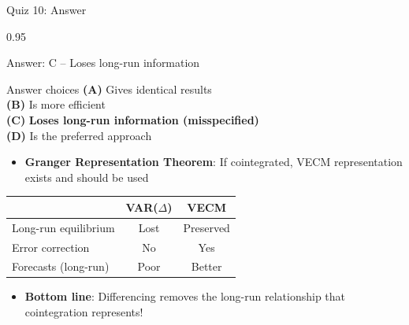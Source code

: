 \documentclass[9pt, aspectratio=169, t]{beamer}
\begin{document}
\begin{frame}{Quiz 10: Answer}
    \begin{cminipage}{0.95\textwidth}
    {\footnotesize
    \begin{exampleblock}{Answer: C -- Loses long-run information}

    \begin{block}{Answer choices}
        \textcolor{MainBlue}{\textbf{(A)}} Gives identical results \incorrect\\[2pt]
        \textcolor{MainBlue}{\textbf{(B)}} Is more efficient \incorrect\\[2pt]
        \textcolor{MainBlue}{\textbf{(C)}} \textbf{\textcolor{Forest}{Loses long-run information (misspecified)}} \correct\\[2pt]
        \textcolor{MainBlue}{\textbf{(D)}} Is the preferred approach \incorrect
    \end{block}

        \vspace{0.1cm}

        \begin{itemize}
            \item \textbf{Granger Representation Theorem}: If cointegrated, VECM representation exists and should be used
        \end{itemize}

        \vspace{0.1cm}
        \begin{center}
        \begin{tabular}{lcc}
            \toprule
            & \textbf{VAR($\Delta$)} & \textbf{VECM} \\
            \midrule
            Long-run equilibrium & Lost & Preserved \\
            Error correction & No & Yes \\
            Forecasts (long-run) & Poor & Better \\
            \bottomrule
        \end{tabular}
        \end{center}

        \vspace{0.1cm}
        \begin{itemize}\setlength{\itemsep}{0pt}
            \item \textbf{Bottom line}: Differencing removes the long-run relationship that cointegration represents!
        \end{itemize}
    \end{exampleblock}
    }
    \end{cminipage}
\end{frame}
\end{document}
